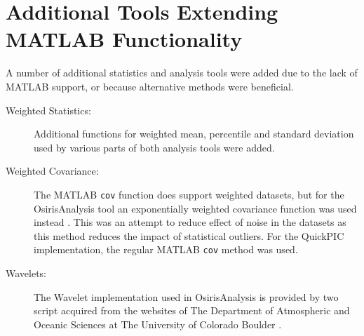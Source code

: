 \section{Additional Tools Extending MATLAB Functionality}
\label{Tools:OAAdd}

A number of additional statistics and analysis tools were added due to the lack of MATLAB support, or because alternative methods were beneficial.

\begin{description}
    \item[Weighted Statistics:] Additional functions for weighted mean, percentile and standard deviation used by various parts of both analysis tools were added.
    \item[Weighted Covariance:] The MATLAB \texttt{cov} function does support weighted datasets, but for the OsirisAnalysis tool an exponentially weighted covariance function was used instead \cite{pozzi:2012}.
    This was an attempt to reduce effect of noise in the datasets as this method reduces the impact of statistical outliers.
    For the QuickPIC implementation, the regular MATLAB \texttt{cov} method was used.
    \item[Wavelets:] The Wavelet implementation used in OsirisAnalysis is provided by two script acquired from the websites of The Department of Atmospheric and Oceanic Sciences at The University of Colorado Boulder \cite{torrence:1998}.
\end{description}

